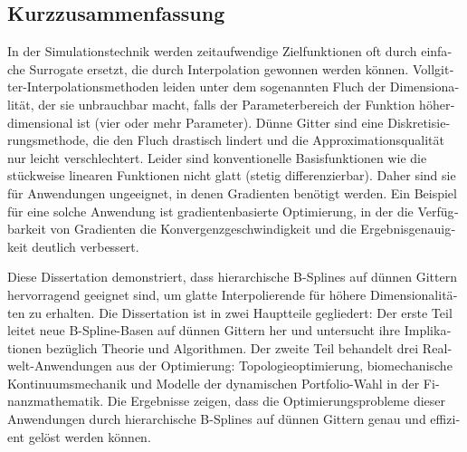 \begin{otherlanguage}{ngerman}
  \section*{Kurzzusammenfassung}
  
  In der Simulationstechnik werden zeitaufwendige Zielfunktionen
  oft durch einfache Surrogate ersetzt, die durch Interpolation
  gewonnen werden können.
  Vollgitter-Interpola\-tions\-methoden leiden unter dem
  sogenannten Fluch der Dimensionalität,
  der sie unbrauchbar macht, falls der Parameterbereich der Funktion
  höherdimensional ist (vier oder mehr Parameter).
  Dünne Gitter sind eine Diskretisierungsmethode, die den Fluch drastisch
  lindert und die Approximationsqualität nur leicht verschlechtert.
  Leider sind konventionelle Basisfunktionen wie die stückweise
  linearen Funktionen nicht glatt (stetig differenzierbar).
  Daher sind sie für Anwendungen ungeeignet, in denen Gradienten
  benötigt werden.
  Ein Beispiel für eine solche Anwendung ist gradientenbasierte Optimierung,
  in der die Verfügbarkeit von Gradienten die Konvergenzgeschwindigkeit und
  die Ergebnisgenauigkeit deutlich verbessert.
  
  Diese Dissertation demonstriert, dass hierarchische B-Splines auf
  dünnen Gittern hervorragend geeignet sind,
  um glatte Interpolierende für höhere Dimensionalitäten zu erhalten.
  Die Dissertation ist in zwei Hauptteile gegliedert:
  Der erste Teil leitet neue B-Spline-Basen auf dünnen Gittern her und
  untersucht ihre Implikationen bezüglich Theorie und Algorithmen.
  Der zweite Teil behandelt drei Realwelt-Anwendungen aus der Optimierung:
  Topologieoptimierung, biomechanische Kontinuumsmechanik und
  Modelle der dynamischen Portfolio-Wahl in der Finanzmathematik.
  Die Ergebnisse zeigen, dass die Optimierungsprobleme dieser
  Anwendungen durch hierarchische B-Splines auf dünnen Gittern
  genau und effizient gelöst werden können.
\end{otherlanguage}

\printornamentstrue
\cleardoublepage
